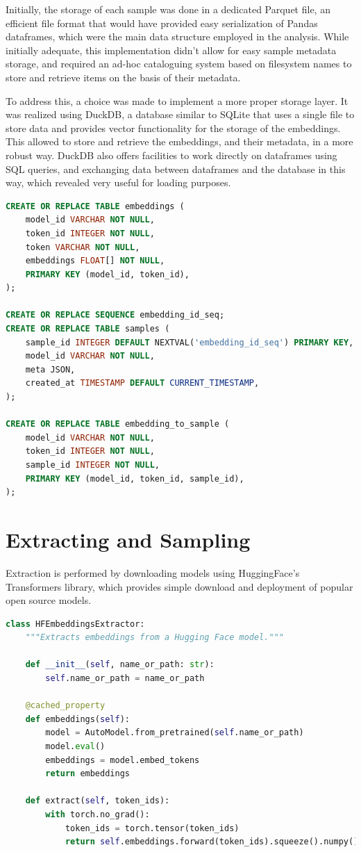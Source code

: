 \documentclass[
  a4paper, twoside, 10pt, titlepage]{book}
\begin{document}
Initially, the storage of each sample was done in a dedicated Parquet
file, an efficient file format that would have provided easy
serialization of Pandas dataframes, which were the main data structure
employed in the analysis. While initially adequate, this implementation
didn't allow for easy sample metadata storage, and required an ad-hoc
cataloguing system based on filesystem names to store and retrieve items
on the basis of their metadata.

To address this, a choice was made to implement a more proper storage
layer. It was realized using DuckDB, a database similar to SQLite that
uses a single file to store data and provides vector functionality for
the storage of the embeddings. This allowed to store and retrieve the
embeddings, and their metadata, in a more robust way. DuckDB also offers
facilities to work directly on dataframes using SQL queries, and
exchanging data between dataframes and the database in this way, which
revealed very useful for loading purposes.

\begin{lstlisting}[language=SQL]
CREATE OR REPLACE TABLE embeddings (
    model_id VARCHAR NOT NULL,
    token_id INTEGER NOT NULL,
    token VARCHAR NOT NULL,
    embeddings FLOAT[] NOT NULL,
    PRIMARY KEY (model_id, token_id),
);

CREATE OR REPLACE SEQUENCE embedding_id_seq;
CREATE OR REPLACE TABLE samples (
    sample_id INTEGER DEFAULT NEXTVAL('embedding_id_seq') PRIMARY KEY,
    model_id VARCHAR NOT NULL,
    meta JSON,
    created_at TIMESTAMP DEFAULT CURRENT_TIMESTAMP,
);

CREATE OR REPLACE TABLE embedding_to_sample (
    model_id VARCHAR NOT NULL,
    token_id INTEGER NOT NULL,
    sample_id INTEGER NOT NULL,
    PRIMARY KEY (model_id, token_id, sample_id),
);
\end{lstlisting}

\section{Extracting and Sampling}\label{extracting-and-sampling}

Extraction is performed by downloading models using HuggingFace's
Transformers library, which provides simple download and deployment of
popular open source models.

\begin{lstlisting}[language=Python]
class HFEmbeddingsExtractor:
    """Extracts embeddings from a Hugging Face model."""

    def __init__(self, name_or_path: str):
        self.name_or_path = name_or_path

    @cached_property
    def embeddings(self):
        model = AutoModel.from_pretrained(self.name_or_path)
        model.eval()
        embeddings = model.embed_tokens
        return embeddings

    def extract(self, token_ids):
        with torch.no_grad():
            token_ids = torch.tensor(token_ids)
            return self.embeddings.forward(token_ids).squeeze().numpy()
\end{lstlisting}
\end{document}

